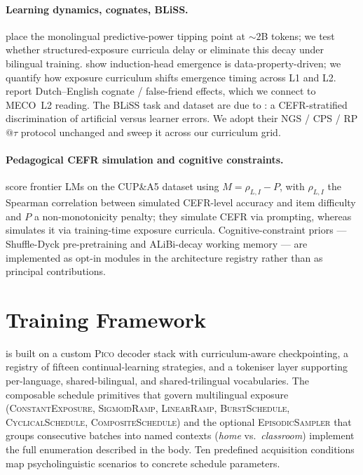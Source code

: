 \paragraph{Learning dynamics, cognates, BLiSS.} \citet{aoyama-wilcox-2025-language} place the monolingual predictive-power tipping point at ${\sim}2$B tokens; we test whether structured-exposure curricula delay or eliminate this decay under bilingual training. \citet{aoyama2025predicting} show induction-head emergence is data-property-driven; we quantify how exposure curriculum shifts emergence timing across L1 and L2. \citet{frank2026dutch} report Dutch--English cognate / false-friend effects, which we connect to MECO~L2 reading. The BLiSS task and dataset are due to \citet{gao2025bliss}: a CEFR-stratified discrimination of artificial versus learner errors. We adopt their NGS / CPS / RP$@\tau$ protocol unchanged and sweep it across our curriculum grid.
 
\paragraph{Pedagogical CEFR simulation and cognitive constraints.} \citet{benedetto-etal-2024-using} score frontier LMs on the CUP\&A5 dataset \citep{mullooly2023cupa5} using $M = \rho_{L,I} - P$, with $\rho_{L,I}$ the Spearman correlation between simulated CEFR-level accuracy and item difficulty and $P$ a non-monotonicity penalty; they simulate CEFR via prompting, whereas \beetle{} simulates it via training-time exposure curricula. Cognitive-constraint priors --- Shuffle-Dyck pre-pretraining \citep{hu2025between} and ALiBi-decay working memory \citep{mita2025wm, madhayastha2026wm} --- are implemented as opt-in modules in the architecture registry rather than as principal contributions.
 
 
\section{\beetle{} Training Framework}\label{sec:train}
 
\beetle{} is built on a custom \textsc{Pico} decoder stack \citep{diehl-martinez-etal-2025-pico} with curriculum-aware checkpointing, a registry of fifteen continual-learning strategies, and a tokeniser layer supporting per-language, shared-bilingual, and shared-trilingual vocabularies. The composable schedule primitives that govern multilingual exposure (\textsc{ConstantExposure}, \textsc{SigmoidRamp}, \textsc{LinearRamp}, \textsc{BurstSchedule}, \textsc{CyclicalSchedule}, \textsc{CompositeSchedule}) and the optional \textsc{EpisodicSampler} that groups consecutive batches into named contexts (\emph{home} vs.\ \emph{classroom}) implement the full enumeration described in the body. Ten predefined acquisition conditions map psycholinguistic scenarios to concrete schedule parameters.
 
